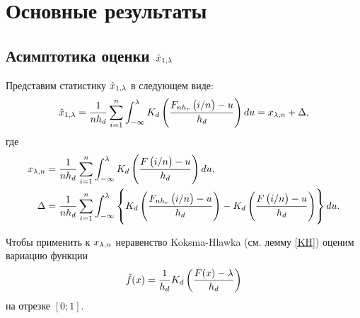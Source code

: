 \documentclass[a4paper,14pt,russian]{article}
\begin{document}
\section{Основные результаты}
\subsection{Асимптотика оценки $\hat{x}_{1,\lambda}$}
Представим статистику  $\hat{x}_{1,\lambda}$ в следующем виде:
\begin{equation*}
\hat{x}_{1,\lambda} = \frac{1}{n h_d} \sum_{i=1}^n \int_{-\infty}^\lambda
K_d\left(\frac{F_{n h_r}\left(i/n\right)-u}{h_d}\right)du = x_{\lambda,n} + \Delta,
\end{equation*}
где
\begin{align*}
  x_{\lambda,n} &=  \frac{1}{n h_d} \sum_{i=1}^n \int_{-\infty}^\lambda
K_d\left(\frac{F\left(i/n\right)-u}{h_d}\right)du,\\
\Delta &=  \frac{1}{n h_d} \sum_{i=1}^n \int_{-\infty}^\lambda
\left\{K_d\left(\frac{F_{n h_r}\left(i/n\right)-u}{h_d}\right)-K_d\left(\frac{F\left(i/n\right)-u}{h_d}\right)\right\}du.
\end{align*}




Чтобы применить к $x_{\lambda,n}$ неравенство Koksma-Hlawka (см. лемму \ref{KH}) оценим вариацию функции
$$
\tilde{f}(x) = \frac{1}{h_d} K_d\left(\frac{F(x)-\lambda}{h_d}\right)
$$
на отрезке $[0;1]$.
\end{document}
